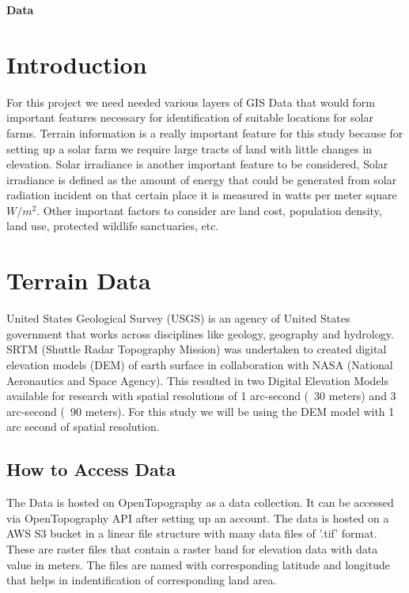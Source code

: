 \documentclass[letterpaper]{article}
\newcommand{\sect}[1]{\begin{center}\textbf{#1}\end{center}}
\begin{document}
\sect{Data}

\section{Introduction}

For this project we need needed various layers of GIS Data that would form important features necessary 
for identification of suitable locations for solar farms. Terrain information is a really important feature
for this study because for setting up a solar farm we require large tracts of land with little changes in
elevation. Solar irradiance is another important feature to be considered, Solar irradiance is defined as 
the amount of energy that could be generated from solar radiation incident on that certain place it is 
measured in watts per meter square $W/m^2$. Other important factors to consider are land cost, population
density, land use, protected wildlife sanctuaries, etc.

\section{Terrain Data}

United States Geological Survey (USGS) is an agency of United States government that works across disciplines
like geology, geography and hydrology. SRTM (Shuttle Radar Topography Mission) was undertaken to created 
digital elevation models (DEM) of earth surface in collaboration with NASA (National Aeronautics and Space
Agency). This resulted in two Digital Elevation Models available for research with spatial resolutions of 
1 arc-second (~30 meters) and 3 arc-second (~90 meters). For this study we will be using the DEM model with
1 arc second of spatial resolution\cite{USGS}.


\subsection{How to Access Data}

The Data is hosted on OpenTopography as a data collection\cite{OpenTopography}. It can be accessed via 
OpenTopography API after setting up an account. The data is hosted on a AWS S3 bucket in a linear file 
structure with many data files of '.tif' format. These are raster files that contain a raster band for
elevation data with data value in meters. The files are named with corresponding latitude and longitude
that helps in indentification of corresponding land area. 
\end{document}
